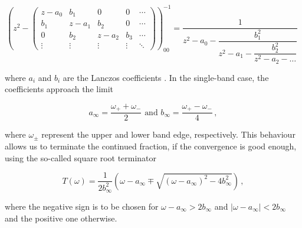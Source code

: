 \documentclass[
    reprint, 
    aps,
    preprintnumbers,
    twocolumn,
    prb,
    superscriptaddress
]{revtex4-2}
\begin{document}
\begin{widetext}
\begin{equation}
    \left( z^2 - \begin{pmatrix}
        z - a_0 & b_1 & 0 & 0 & \cdots \\
        b_1 & z - a_1 & b_2 & 0 & \cdots \\
        0 & b_2 & z - a_2 & b_3 & \cdots \\
        \vdots & \vdots & \vdots & \vdots & \ddots
    \end{pmatrix} \right)_{00}^{-1} = \dfrac{1}{z^2 - a_0 - \dfrac{b_1^2}{z^2 - a_1 - \dfrac{b_2^2}{ z^2 - a_2 - \hdots}}}\,\,
\end{equation}
\end{widetext}

where $a_i$ and $b_i$ are the Lanczos coefficients \cite{PettiforRecursion,ViswanathRecursion}.
In the single-band case, the coefficients approach the limit

\begin{equation}
    \label{eqn:inf_lanczos}
    a_\infty = \frac{\omega_+ + \omega_-}{2}\text{ and } b_\infty = \frac{\omega_+ - \omega_-}{4}\,,
\end{equation}

where $\omega_\pm$ represent the upper and lower band edge, respectively.
This behaviour allows us to terminate the continued fraction, if the convergence is good enough, using the so-called square root terminator

\begin{equation}
    T(\omega) = \frac{1}{2b_\infty^2} \left( \omega - a_\infty \mp \sqrt{(\omega - a_\infty)^2 - 4 b_\infty^2} \right)\,,
\end{equation}

where the negative sign is to be chosen for $\omega - a_\infty > 2b_\infty$ and $|\omega - a_\infty| < 2b_\infty$ and the positive one otherwise.

\end{document}
